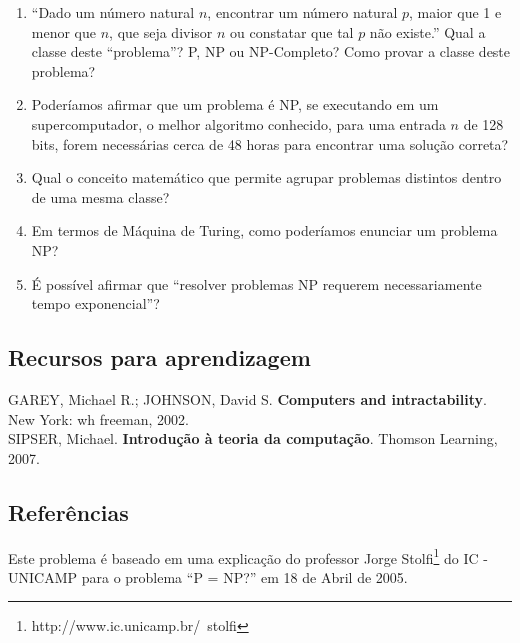 \begin{enumerate}
\item{``Dado um número natural $n$, encontrar um número natural $p$, maior que 1
e menor que $n$, que seja divisor $n$ ou constatar que tal $p$ não existe.''
Qual a classe deste ``problema''? P, NP ou NP-Completo? Como provar a
classe deste problema?}

\item{Poderíamos afirmar que um problema é NP, se executando em um supercomputador,
o melhor algoritmo conhecido, para uma entrada $n$ de 128 bits, forem necessárias
cerca de 48 horas para encontrar
uma solução correta?}

\item{Qual o conceito matemático que permite agrupar problemas distintos dentro de uma mesma classe?}

\item{Em termos de Máquina de Turing, como poderíamos enunciar um problema NP?}

\item{É possível afirmar que ``resolver problemas NP requerem necessariamente tempo exponencial''?}

\end{enumerate}

\subsection{Recursos para aprendizagem}

\noindent

\noindent
GAREY, Michael R.; JOHNSON, David S. \textbf{Computers and intractability}. New York: wh freeman, 2002.\\

\noindent
SIPSER, Michael. \textbf{Introdução à teoria da computação}. Thomson Learning, 2007.\\


\subsection*{Referências}

Este problema é baseado em uma explicação do
professor Jorge Stolfi\footnote{\scriptsize{http://www.ic.unicamp.br/~stolfi}} do IC - UNICAMP
para o problema ``P = NP?'' em 18 de Abril de 2005.
